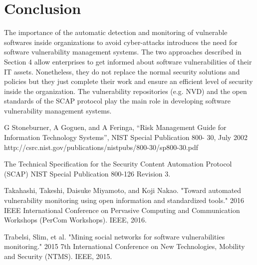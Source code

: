 \documentclass{llncs}
\begin{document}
 \newpage  
\section{Conclusion}

\par The importance of the automatic detection and monitoring of vulnerable softwares inside organizations to avoid cyber-attacks introduces the need for software vulnerability management systems. The two approaches described in Section 4 allow enterprises to get informed about software vulnerabilities of their IT assets. Nonetheless, they do not replace the normal security solutions and policies but they just complete their work and ensure an efficient level of security inside the organization. The vulnerability repositories (e.g. NVD) and the open standards of the SCAP protocol play the main role in developing software vulnerability management systems.   


\newpage
\begin{thebibliography}{[MT1]}

%


G Stoneburner, A Goguen, and A Feringa, “Risk Management Guide
for Information Technology Systems”, NIST Special Publication 800-
30, July 2002
http://csrc.nist.gov/publications/nistpubs/800-30/sp800-30.pdf

The Technical Specification for the
Security Content Automation Protocol (SCAP)
NIST Special Publication 800-126
Revision 3.

Takahashi, Takeshi, Daisuke Miyamoto, and Koji Nakao. "Toward automated vulnerability monitoring using open information and standardized tools." 2016 IEEE International Conference on Pervasive Computing and Communication Workshops (PerCom Workshops). IEEE, 2016.

Trabelsi, Slim, et al. "Mining social networks for software vulnerabilities monitoring." 2015 7th International Conference on New Technologies, Mobility and Security (NTMS). IEEE, 2015.
%
\end{thebibliography}
\end{document}
